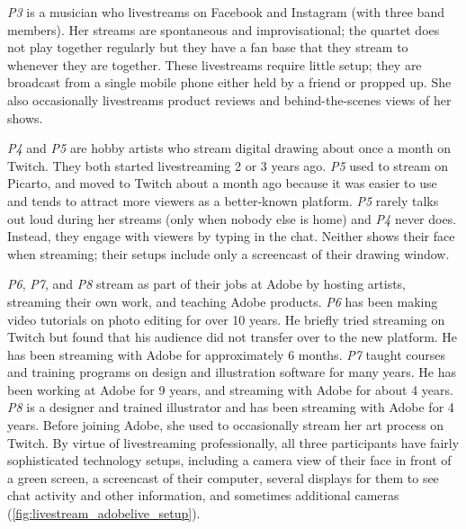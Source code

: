 \textit{P3} is a musician who livestreams on Facebook and Instagram (with three band members). Her streams are spontaneous and improvisational; the quartet does not play together regularly but they have a fan base that they stream to whenever they are together. These livestreams require little setup; they are broadcast from a single mobile phone either held by a friend or propped up. She also occasionally livestreams product reviews and behind-the-scenes views of her shows.

\textit{P4} and \textit{P5} are hobby artists who stream digital drawing about once a month on Twitch. They both started livestreaming 2 or 3 years ago. \textit{P5} used to stream on Picarto, and moved to Twitch about a month ago because it was easier to use and tends to attract more viewers as a better-known platform. \textit{P5} rarely talks out loud during her streams (only when nobody else is home) and \textit{P4} never does. Instead, they engage with viewers by typing in the chat. Neither shows their face when streaming; their setups include only a screencast of their drawing window. 

\textit{P6}, \textit{P7}, and \textit{P8} stream as part of their jobs at Adobe by hosting artists, streaming their own work, and teaching Adobe products.
\textit{P6} has been making video tutorials on photo editing for over 10 years. He briefly tried streaming on Twitch but found that his audience did not transfer over to the new platform. He has been streaming with Adobe for approximately 6 months. \textit{P7} taught courses and training programs on design and illustration software for many years. He has been working at Adobe for 9 years, and streaming with Adobe for about 4 years. 
\textit{P8} is a designer and trained illustrator and has been streaming with Adobe for 4 years. Before joining Adobe, she used to occasionally stream her art process on Twitch. By virtue of livestreaming professionally, all three participants have fairly sophisticated technology setups, including a camera view of their face in front of a green screen, a screencast of their computer, several displays for them to see chat activity and other information, and sometimes additional cameras (\autoref{fig:livestream_adobelive_setup}). 


